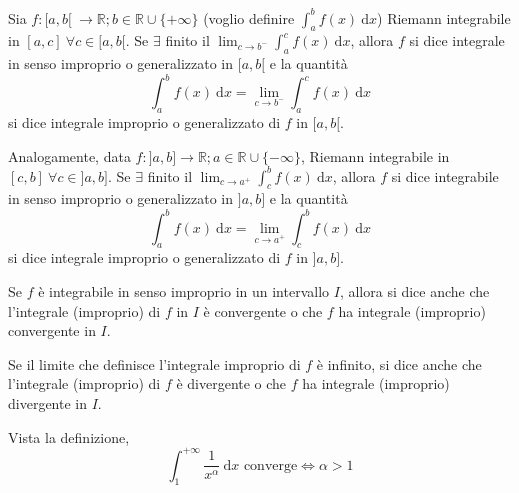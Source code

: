 \begin{definition}
	Sia $f:[a,b[ \ \rightarrow \mathbb{R}; b \in \mathbb{R} \cup\{+\infty\}$ (voglio definire $\int_{a}^{b}f(x) \ \mathrm{d}x$) Riemann integrabile in $[a,c] \ \forall c \in [a,b[$. Se $\exists$ finito il $\lim_{c \rightarrow b^-} \int_{a}^{c} f(x) \ \mathrm{d}x $, allora $f$ si dice integrale in senso improprio o generalizzato in $[a,b[$ e la quantità 
	\begin{equation*}
		\int_{a}^{b} f(x) \ \mathrm{d} x = \lim_{c\rightarrow b^-} \int_{a}^{c} f(x) \ \mathrm{d} x
	\end{equation*}
	si dice integrale improprio o generalizzato di $f$ in $[a,b[$.
	
	Analogamente, data $f:]a,b]\rightarrow \mathbb{R}; a \in \mathbb{R} \cup \{-\infty\}$, Riemann integrabile in $[c,b] \ \forall c \in ]a,b]$. Se $\exists$ finito il $\lim_{c \rightarrow a^+} \int_{c}^{b} f(x) \ \mathrm{d}x$, allora $f$ si dice integrabile in senso improprio o generalizzato in $]a,b]$ e la quantità
	\begin{equation*}
		\int_{a}^{b} f(x) \ \mathrm{d}x = \lim_{c \rightarrow a^+} \int_{c}^{b} f(x) \ \mathrm{d}x
	\end{equation*}
	si dice integrale improprio o generalizzato di $f$ in $]a,b]$.
	
	Se $f$ è integrabile in senso improprio in un intervallo $I$, allora si dice anche che l'integrale (improprio) di $f$ in $I$ è convergente o che $f$ ha integrale (improprio) convergente in $I$.
	
	Se il limite che definisce l'integrale improprio di $f$ è infinito, si dice anche che l'integrale (improprio) di $f$ è divergente o che $f$ ha integrale (improprio) divergente in $I$.
\end{definition}

\begin{attbar}
		Vista la definizione, 
	\begin{equation*}
		\int_{1}^{+\infty} \frac{1}{x^\alpha} \ \mathrm{d}x \text{ converge} \iff \alpha > 1
	\end{equation*}
\end{attbar}

